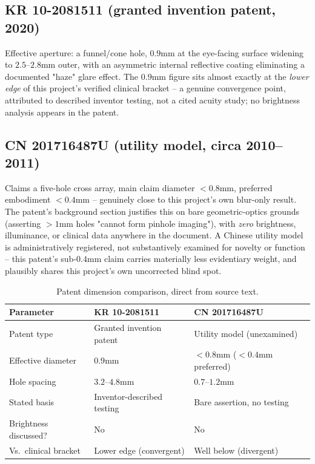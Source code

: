 \documentclass[11pt]{report}
\begin{document}
\subsection{KR 10-2081511 (granted invention patent, 2020)}
Effective aperture: a funnel/cone hole, $0.9$mm at the eye-facing surface widening to $2.5$--$2.8$mm outer, with an asymmetric internal reflective coating eliminating a documented "haze" glare effect. The $0.9$mm figure sits almost exactly at the \emph{lower edge} of this project's verified clinical bracket -- a genuine convergence point, attributed to described inventor testing, not a cited acuity study; no brightness analysis appears in the patent.

\subsection{CN 201716487U (utility model, circa 2010--2011)}
Claims a five-hole cross array, main claim diameter $<0.8$mm, preferred embodiment $<0.4$mm -- genuinely close to this project's own blur-only result. The patent's background section justifies this on bare geometric-optics grounds (asserting $>1$mm holes "cannot form pinhole imaging"), with \emph{zero} brightness, illuminance, or clinical data anywhere in the document. A Chinese utility model is administratively registered, not substantively examined for novelty or function -- this patent's sub-$0.4$mm claim carries materially less evidentiary weight, and plausibly shares this project's own uncorrected blind spot.

\begin{table}[h!]
\centering
\caption{Patent dimension comparison, direct from source text.}
\begin{tabular}{p{4cm}p{4cm}p{4cm}}
\toprule
Parameter & KR 10-2081511 & CN 201716487U \\
\midrule
Patent type & Granted invention patent & Utility model (unexamined) \\
Effective diameter & $0.9$mm & $<0.8$mm ($<0.4$mm preferred) \\
Hole spacing & $3.2$--$4.8$mm & $0.7$--$1.2$mm \\
Stated basis & Inventor-described testing & Bare assertion, no testing \\
Brightness discussed? & No & No \\
Vs.\ clinical bracket & Lower edge (convergent) & Well below (divergent) \\
\bottomrule
\end{tabular}
\end{table}
\end{document}
